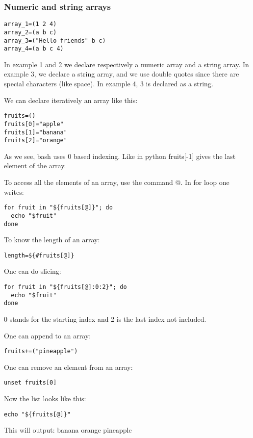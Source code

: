 \documentclass[24pt]{article}
\begin{document}
\subsubsection{Numeric and string arrays}
\begin{lstlisting}
array_1=(1 2 4)
array_2=(a b c)
array_3=("Hello friends" b c)
array_4=(a b c 4)
\end{lstlisting}

In example 1 and 2 we declare respectively a numeric array and a string array. In example 3, we declare a string array, and we use double quotes since there are special characters (like space). In example 4, 3 is declared as a string.

We can declare iteratively an array like this:

\begin{lstlisting}
fruits=()
fruits[0]="apple"
fruits[1]="banana"
fruits[2]="orange"
\end{lstlisting}
As we see, bash uses 0 based indexing. Like in python fruits[-1] gives the last element of the array.


To access all the elements of an array, use the command @. In for loop one writes:
\begin{lstlisting}
for fruit in "${fruits[@]}"; do
  echo "$fruit"
done
\end{lstlisting}


To know the length of an array:
\begin{lstlisting}
length=${#fruits[@]}
\end{lstlisting}

One can do slicing:
\begin{lstlisting}
for fruit in "${fruits[@]:0:2}"; do
  echo "$fruit"
done
\end{lstlisting}
0 stands for the starting index and 2 is the last index not included.

One can append to an array: 
\begin{lstlisting}
fruits+=("pineapple")
\end{lstlisting}

One can remove an element from an array: 
\begin{lstlisting}
unset fruits[0]   
\end{lstlisting}

Now the list looks like this:
\begin{lstlisting}
echo "${fruits[@]}"
\end{lstlisting}

This will output:
banana orange pineapple
\end{document}
